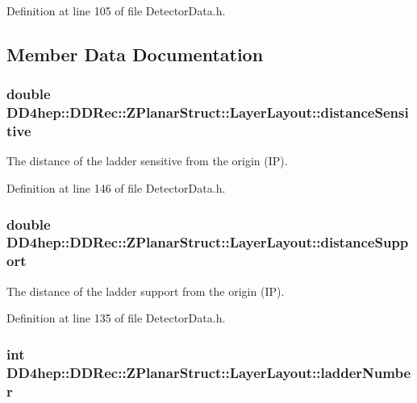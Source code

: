 Definition at line 105 of file DetectorData.h.

\subsection{Member Data Documentation}
\hypertarget{struct_d_d4hep_1_1_d_d_rec_1_1_z_planar_struct_1_1_layer_layout_a3bff9db37d2d2cb49055c2bd59c69ebd}{
\subsubsection[{distanceSensitive}]{\setlength{\rightskip}{0pt plus 5cm}double {\bf DD4hep::DDRec::ZPlanarStruct::LayerLayout::distanceSensitive}}}
\label{struct_d_d4hep_1_1_d_d_rec_1_1_z_planar_struct_1_1_layer_layout_a3bff9db37d2d2cb49055c2bd59c69ebd}


The distance of the ladder sensitive from the origin (IP). 

Definition at line 146 of file DetectorData.h.\hypertarget{struct_d_d4hep_1_1_d_d_rec_1_1_z_planar_struct_1_1_layer_layout_ad8dd683017ec90bd4663b66fce126208}{
\subsubsection[{distanceSupport}]{\setlength{\rightskip}{0pt plus 5cm}double {\bf DD4hep::DDRec::ZPlanarStruct::LayerLayout::distanceSupport}}}
\label{struct_d_d4hep_1_1_d_d_rec_1_1_z_planar_struct_1_1_layer_layout_ad8dd683017ec90bd4663b66fce126208}


The distance of the ladder support from the origin (IP). 

Definition at line 135 of file DetectorData.h.\hypertarget{struct_d_d4hep_1_1_d_d_rec_1_1_z_planar_struct_1_1_layer_layout_ae351fc83c681934cc2bd3b9032224392}{
\subsubsection[{ladderNumber}]{\setlength{\rightskip}{0pt plus 5cm}int {\bf DD4hep::DDRec::ZPlanarStruct::LayerLayout::ladderNumber}}}
\label{struct_d_d4hep_1_1_d_d_rec_1_1_z_planar_struct_1_1_layer_layout_ae351fc83c681934cc2bd3b9032224392}


